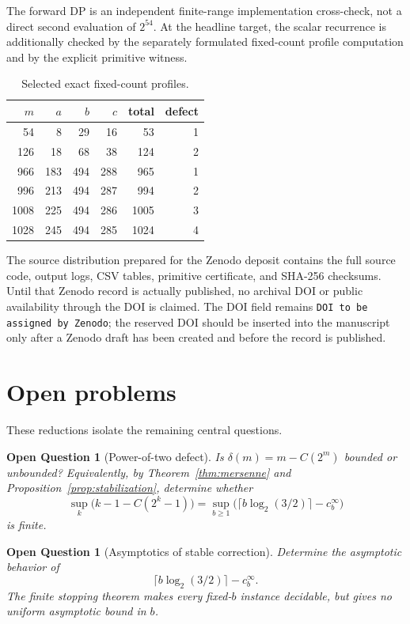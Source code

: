\documentclass[11pt]{article}
\newtheorem{question}[theorem]{Open Question}
\newcommand{\ZenodoDOI}{DOI to be assigned by Zenodo}
\begin{document}
The forward DP is an independent finite-range implementation cross-check, not a direct second evaluation of $2^{54}$. At the headline target, the scalar recurrence is additionally checked by the separately formulated fixed-count profile computation and by the explicit primitive witness.

\begin{table}[t]
\centering
\caption{Selected exact fixed-count profiles.}
\begin{tabular}{rrrrrr}
\toprule
$m$ & $a$ & $b$ & $c$ & total & defect\\
\midrule
54&8&29&16&53&1\\
126&18&68&38&124&2\\
966&183&494&288&965&1\\
996&213&494&287&994&2\\
1008&225&494&286&1005&3\\
1028&245&494&285&1024&4\\
\bottomrule
\end{tabular}
\end{table}

The source distribution prepared for the Zenodo deposit contains the full source code, output logs, CSV tables, primitive certificate, and SHA-256 checksums. Until that Zenodo record is actually published, no archival DOI or public availability through the DOI is claimed. The DOI field remains \texttt{\ZenodoDOI}; the reserved DOI should be inserted into the manuscript only after a Zenodo draft has been created and before the record is published.

\section{Open problems}
These reductions isolate the remaining central questions.

\begin{question}[Power-of-two defect]
Is $\delta(m)=m-C(2^m)$ bounded or unbounded? Equivalently, by Theorem~\ref{thm:mersenne} and Proposition~\ref{prop:stabilization}, determine whether
\[
 \sup_k\bigl(k-1-C(2^k-1)\bigr)
 =
 \sup_{b\ge1}\bigl(\lceil b\log_2(3/2)\rceil-c_b^\infty\bigr)
\]
is finite.
\end{question}

\begin{question}[Asymptotics of stable correction]
Determine the asymptotic behavior of
\[
 \lceil b\log_2(3/2)\rceil-c_b^\infty.
\]
The finite stopping theorem makes every fixed-$b$ instance decidable, but gives no uniform asymptotic bound in $b$.
\end{question}
\end{document}
